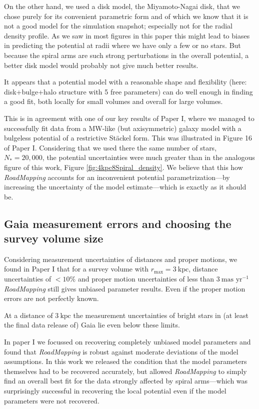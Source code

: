 \documentclass[iop,revtex4,numberedappendix,appendixfloats]{emulateapj}
\newcommand{\RM}{{\sl RoadMapping}}
\begin{document}
On the other hand, we used a disk model, the Miyamoto-Nagai disk, that we chose purely for its convenient parametric form and of which we know that it is not a good model for the simulation snapshot; especially not for the radial density profile. As we saw in most figures in this paper this might lead to biases in predicting the potential at radii where we have only a few or no stars. But because the spiral arms are such strong perturbations in the overall potential, a better disk model would probably not give much better results.

It appears that a potential model with a reasonable shape and flexibility (here: disk+bulge+halo structure with 5 free parameters) can do well enough in finding a good fit, both locally for small volumes and overall for large volumes.

This is in agreement with one of our key results of Paper I, where we managed to successfully fit data from a MW-like (but axisymmetric) galaxy model with a bulgeless potential of a restrictive St\"ackel form. This was illustrated in Figure 16 of Paper I. Considering that we used there the same number of stars, $N_*=20,000$, the potential uncertainties were much greater than in the analogous figure of this work, Figure \ref{fig:4kpc8Spiral_density}. We believe that this how \RM{} accounts for an inconvenient potential parametrization---by increasing the uncertainty of the model estimate---which is exactly as it should be.

\subsection{Gaia measurement errors and choosing the survey volume size} \label{sec:discussion_choosing_SV}

Considering measurement uncertainties of distances and proper motions, we found in Paper I that for a survey volume with $r_\text{max} = 3~\text{kpc}$, distance uncertainties of $<10\%$ and proper motion uncertainties of less than $3~\text{mas yr}^{-1}$ \RM{} still gives unbiased parameter results. Even if the proper motion errors are not perfectly known. 

At a distance of $3~\text{kpc}$ the measurement uncertainties of bright stars in (at least the final data release of) Gaia lie even below these limits. 

In paper I we focussed on recovering completely unbiased model parameters and found that \RM{} is robust against moderate deviations of the model assumptions. In this work we released the condition that the model parameters themselves had to be recovered accurately, but allowed \RM{} to simply find an overall best fit for the data strongly affected by spiral arms---which was surprisingly successful in recovering the local potential even if the model parameters were not recovered. 
\end{document}

